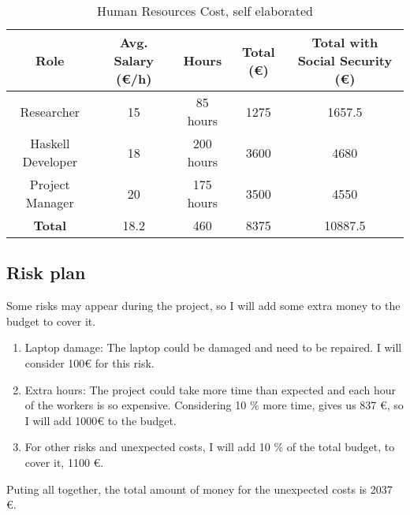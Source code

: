 \begin{table}[H]
    \begin{adjustwidth}{-1in}{-1in} %
    \centering
    \begin{tabular}{|c|c|c|c|c|}
    \hline
    \textbf{Role} & \textbf{Avg. Salary (€/h)} & \textbf{Hours} & \textbf{Total (€)} & \textbf{Total with Social Security (€)} \\ 
    \hline
    Researcher & 15 & 85 hours & 1275 & 1657.5\\
    \hline
    Haskell Developer & 18 & 200 hours & 3600 & 4680\\
    \hline
    Project Manager & 20 & 175 hours & 3500 & 4550\\
    \hline
    \hline
    \textbf{Total} & 18.2 & 460 & 8375 &  10887.5\\
    \hline
    \end{tabular}
    \caption{Human Resources Cost, self elaborated}
    \label{human_resources}
    \end{adjustwidth}
    \end{table}
\subsection*{Risk plan}
Some risks may appear during the project, so I will add some extra money to the budget to cover it.
\begin{enumerate}
    \item Laptop damage: The laptop could be damaged and need to be repaired. I will consider 100€ for this risk.
    \item Extra hours: The project could take more time than expected and each hour of the workers is so expensive. Considering 10 \% more time, gives us 837 €, so I will add 1000€ to the budget.
    \item For other risks and unexpected costs, I will add 10 \% of the total budget, to cover it, 1100 €.
\end{enumerate}
Puting all together, the total amount of money for the unexpected costs is 2037 €.
